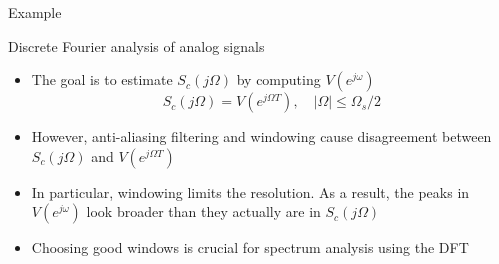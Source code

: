 \documentclass[10pt]{beamer}
\begin{document}
%
\begin{frame}{Example}
\centering
{}
\end{frame}

\begin{frame}{Discrete Fourier analysis of analog signals}
	\begin{itemize}
		\item The goal is to estimate $S_c(j\Omega)$ by computing $V(e^{j\omega})$ 
		\begin{equation*}
			S_c(j\Omega) = V(e^{j\Omega T}), \quad |\Omega| \leq \Omega_s/2  \tag{ideally}
		\end{equation*}
		\item However, anti-aliasing filtering and windowing cause disagreement between $S_c(j\Omega)$ and $V(e^{j\Omega T})$
		\item In particular, windowing limits the resolution. As a result, the peaks in $V(e^{j\omega})$ look broader than they actually are in $S_c(j\Omega)$
		\item Choosing good windows is crucial for spectrum analysis using the DFT
	\end{itemize}
\end{frame}
\end{document}
